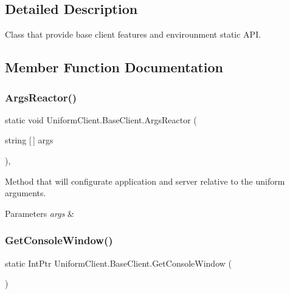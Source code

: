 \subsection{Detailed Description}
Class that provide base client features and envirounment static A\+PI. 



\subsection{Member Function Documentation}
\mbox{\label{class_uniform_client_1_1_base_client_a7ec48981cf3e7ec10d2cb7dff81f912a}} 
\subsubsection{\texorpdfstring{Args\+Reactor()}{ArgsReactor()}}
{\footnotesize\ttfamily static void Uniform\+Client.\+Base\+Client.\+Args\+Reactor (\begin{DoxyParamCaption}\item[{string \mbox{[}$\,$\mbox{]}}]{args }\end{DoxyParamCaption})\hspace{0.3cm}{\ttfamily [static]}, {\ttfamily [protected]}}



Method that will configurate application and server relative to the uniform arguments. 


\begin{DoxyParams}{Parameters}
{\em args} & \\
\hline
\end{DoxyParams}
\mbox{\label{class_uniform_client_1_1_base_client_aafcfed25b79baed0db4448f2e30f2aa2}} 
\subsubsection{\texorpdfstring{Get\+Console\+Window()}{GetConsoleWindow()}}
{\footnotesize\ttfamily static Int\+Ptr Uniform\+Client.\+Base\+Client.\+Get\+Console\+Window (\begin{DoxyParamCaption}{ }\end{DoxyParamCaption})\hspace{0.3cm}{\ttfamily [protected]}}




